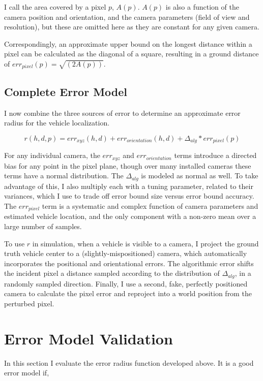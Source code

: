 \documentclass[a4paper,12pt,twoside,openright]{report}
\begin{document}
I call the area covered by a pixel $p$, $A(p)$. $A(p)$ is also a function of the camera
position and orientation, and the camera parameters (field of view and resolution),
but these are omitted here as they are constant for any given camera.

Correspondingly, an approximate upper bound on the longest distance
within a pixel can be calculated as the diagonal of a square,
resulting in a ground distance of $err_{pixel}(p) = \sqrt{(2A(p))}$. 


\subsection{Complete Error Model}
\label{sec:cameramodel:r}

I now combine the three sources of error to determine an approximate
error radius for the vehicle localization.

\[
    r(h,d,p) = err_{xyz}(h,d) + err_{orientation}(h,d) + \Delta_{alg}*err_{pixel}(p)
\]

For any individual camera, the $err_{xyz}$ and $err_{orientation}$ terms introduce
a directed bias for any point in the pixel plane, though over many installed cameras
these terms have a normal distribution. The $\Delta_{alg}$ is 
modeled as normal as well. To take advantage of this, I also multiply each with a tuning
parameter, related to their variances, which I use to trade off error bound size versus
error bound accuracy. The $err_{pixel}$ term is a systematic 
and complex function of camera parameters and estimated vehicle location, and
the only component with a non-zero mean over a large number of samples.

To use $r$ in simulation, when a vehicle is visible to a camera,
I project the ground truth vehicle center to a (slightly-mispositioned) camera, which
automatically incorporates the positional and orientational errors.
The algorithmic error shifts the incident pixel a distance sampled according to the distribution 
of $\Delta_{alg}$, in a randomly sampled direction. 
Finally, I use a second, fake, perfectly positioned camera 
to calculate the pixel error and reproject into a world position from the perturbed pixel.

\section{Error Model Validation}
\label{sec:camera:validation}

In this section I evaluate the error radius function developed above. It is a good error model if,
\end{document}
